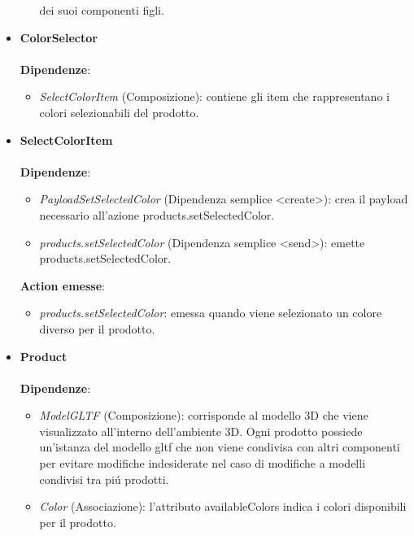 \begin{itemize}
\begin{itemize}
			dei suoi componenti figli.
		\end{itemize}
		\item \textbf{ColorSelector}
		\\\\
		\textbf{Dipendenze}:
		\begin{itemize}
			\item \textit{SelectColorItem} (Composizione): contiene gli item che rappresentano i colori selezionabili del prodotto.
		\end{itemize}
		\item \textbf{SelectColorItem}
		\\\\
		\textbf{Dipendenze}:
		\begin{itemize}
			\item \textit{PayloadSetSelectedColor} (Dipendenza semplice \textless create\textgreater): crea il payload necessario all'azione products.setSelectedColor.
			\item \textit{products.setSelectedColor} (Dipendenza semplice \textless send\textgreater): emette products.setSelectedColor.
		\end{itemize}
		\textbf{Action emesse}:
		\begin{itemize}
			\item \textit{products.setSelectedColor}: emessa quando viene selezionato un colore diverso per il prodotto.
		\end{itemize}
		\item \textbf{Product}
		\\\\
		\textbf{Dipendenze}:
		\begin{itemize}
			\item \textit{ModelGLTF} (Composizione): corrisponde al modello 3D che viene visualizzato all'interno dell'ambiente 3D.
			Ogni prodotto possiede un'istanza del modello gltf che non viene condivisa con altri componenti per evitare
			modifiche indesiderate nel caso di modifiche a modelli condivisi tra piú prodotti.
			\item \textit{Color} (Associazione): l'attributo availableColors indica i colori disponibili per il prodotto.
		\end{itemize}
\end{itemize}


